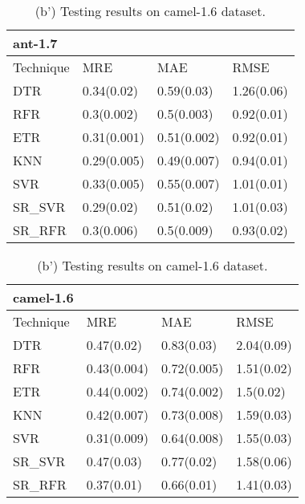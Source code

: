 \documentclass[]{article}
\begin{document}
		\begin{table}[h]
		\captionsetup[subtable]{labelformat=empty}
		\begin{adjustwidth}{-2.9cm}{}
			\begin{subtable}{9cm}
				\centering
				\caption{(a') Testing results on ant-1.7 dataset.}
				\label{tab:ant-wv}
				\begin{tabular}{llll}
					\hline
					ant-1.7 &&&\\ \hline
					Technique & MRE & MAE & RMSE\\  \hline
					DTR & 0.34(0.02) & 0.59(0.03) & 1.26(0.06)\\ 
					RFR & 0.3(0.002) & 0.5(0.003) & 0.92(0.01)\\ 
					ETR & 0.31(0.001) & 0.51(0.002) & 0.92(0.01)\\ 
					KNN & 0.29(0.005) & 0.49(0.007) & 0.94(0.01)\\ 
					SVR & 0.33(0.005) & 0.55(0.007) & 1.01(0.01)\\ 
					SR\_SVR & 0.29(0.02) & 0.51(0.02) & 1.01(0.03)\\
					SR\_RFR & 0.3(0.006) & 0.5(0.009) & 0.93(0.02)\\ \hline
				\end{tabular}
			\end{subtable}
			\begin{subtable}{9cm}
				\centering
				\caption{(b') Testing results on camel-1.6 dataset.}
				\label{tab:camel-wv}
				\begin{tabular}{llll}
					\hline
					camel-1.6 &&&\\ \hline
					Technique & MRE & MAE & RMSE\\  \hline
					DTR & 0.47(0.02) & 0.83(0.03) & 2.04(0.09)\\ 
					RFR & 0.43(0.004) & 0.72(0.005) & 1.51(0.02)\\ 
					ETR & 0.44(0.002) & 0.74(0.002) & 1.5(0.02)\\ 
					KNN & 0.42(0.007) & 0.73(0.008) & 1.59(0.03)\\ 
					SVR & 0.31(0.009) & 0.64(0.008) & 1.55(0.03)\\ 
					SR\_SVR & 0.47(0.03) & 0.77(0.02) & 1.58(0.06)\\
					SR\_RFR & 0.37(0.01) & 0.66(0.01) & 1.41(0.03)\\ \hline
				\end{tabular}
			\end{subtable} 
		\end{adjustwidth}
	\end{table}
\end{document}
